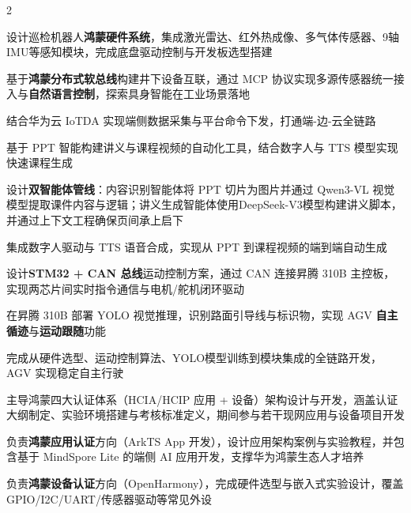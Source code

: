 \documentclass[]{deedy-resume-openfont}
\begin{document}
\begin{paracol}{2}
\begin{tightemize}
    \item 设计巡检机器人\textbf{鸿蒙硬件系统}，集成激光雷达、红外热成像、多气体传感器、9轴IMU等感知模块，完成底盘驱动控制与开发板选型搭建
    \item 基于\textbf{鸿蒙分布式软总线}构建井下设备互联，通过 MCP 协议实现多源传感器统一接入与\textbf{自然语言控制}，探索具身智能在工业场景落地
    \item 结合华为云 IoTDA 实现端侧数据采集与平台命令下发，打通端-边-云全链路
\end{tightemize}
\sectionsep

\begin{tightemize}
    \item 基于 PPT 智能构建讲义与课程视频的自动化工具，结合数字人与 TTS 模型实现快速课程生成
    \item 设计\textbf{双智能体管线}：内容识别智能体将 PPT 切片为图片并通过 Qwen3-VL 视觉模型提取课件内容与逻辑；讲义生成智能体使用DeepSeek-V3模型构建讲义脚本，并通过上下文工程确保页间承上启下
    \item 集成数字人驱动与 TTS 语音合成，实现从 PPT 到课程视频的端到端自动生成
\end{tightemize}
\sectionsep

\begin{tightemize}
    \item 设计\textbf{STM32 + CAN 总线}运动控制方案，通过 CAN 连接昇腾 310B 主控板，实现两芯片间实时指令通信与电机/舵机闭环驱动
    \item 在昇腾 310B 部署 YOLO 视觉推理，识别路面引导线与标识物，实现 AGV \textbf{自主循迹}与\textbf{运动跟随}功能
    \item 完成从硬件选型、运动控制算法、YOLO模型训练到模块集成的全链路开发，AGV 实现稳定自主行驶
\end{tightemize}
\sectionsep

\begin{tightemize}
    \item 主导鸿蒙四大认证体系（HCIA/HCIP 应用 + 设备）架构设计与开发，涵盖认证大纲制定、实验环境搭建与考核标准定义，期间参与若干现网应用与设备项目开发
    \item 负责\textbf{鸿蒙应用认证}方向（ArkTS App 开发），设计应用架构案例与实验教程，并包含基于 MindSpore Lite 的端侧 AI 应用开发，支撑华为鸿蒙生态人才培养
    \item 负责\textbf{鸿蒙设备认证}方向（OpenHarmony），完成硬件选型与嵌入式实验设计，覆盖 GPIO/I2C/UART/传感器驱动等常见外设
\end{tightemize}
\sectionsep


\end{paracol}
\end{document}
